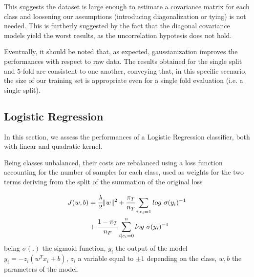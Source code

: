 This suggests the dataset is large enough to estimate a covariance matrix for each class and loosening our assumptions (introducing diagonalization or tying) is not needed. This is furtherly suggested by the fact that the diagonal covariance models yield the worst results, as the uncorrelation hypotesis does not hold.

Eventually, it should be noted that, as expected, gaussianization improves the performances with respect to raw data. The results obtained for the single split and 5-fold are consistent to one another, conveying that, in this specific scenario, the size of our training set is appropriate even for a single fold evaluation (i.e. a single split).


\subsection{Logistic Regression}

In this section, we assess the performances of a Logistic Regression classifier, both with linear and quadratic kernel.

Being classes unbalanced, their costs are rebalanced using a loss function accounting for the number of samples for each class, used as weights for the two terms deriving from the split of the summation of the original loss

\begin{align*}
	J(w, b) &= \cfrac{\lambda}{2} \|w\|^2 + \cfrac{\pi_T}{n_T} \sum_{i|c_i=1} log \ \sigma(y_i)^{-1} 
	\\ &+ \cfrac{1 - \pi_T}{n_F} \sum^n_{i| c_i=0} log \ \sigma(y_i)^{-1} 
\end{align*}
being $\sigma(.)$ the sigmoid function, $y_i$ the output of the model $y_i = - z_i (w^T x_i + b)$, $z_i$ a variable equal to $\pm 1$ depending on the class, $w, b$ the parameters of the model. 

